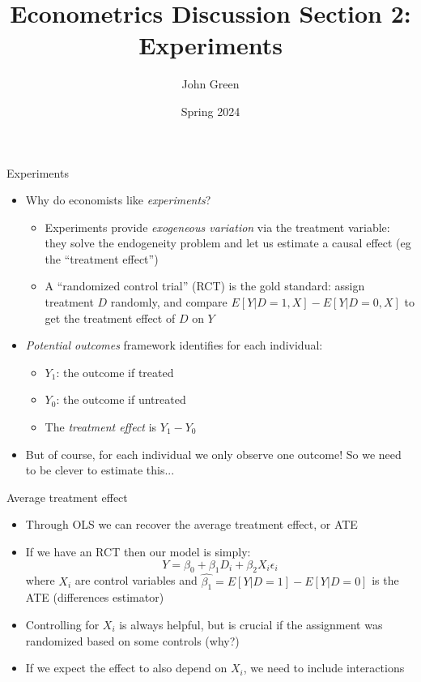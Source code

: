 \documentclass[aspectratio=169]{beamer}
\title{Econometrics Discussion Section 2: Experiments}
\author{John Green}
\date{Spring 2024}
\begin{document}
\begin{frame}
    \titlepage 
\end{frame}

\begin{frame}{Experiments}
    \begin{itemize}
        \item Why do economists like \textit{experiments}?
        \begin{itemize}
            \item Experiments provide \textit{exogeneous variation} via the treatment variable: they solve the endogeneity problem and let us estimate a causal effect (eg the ``treatment effect'')
            \item A ``randomized control trial'' (RCT) is the gold standard: assign treatment $D$ randomly, and compare $E[Y|D=1,X] - E[Y|D=0,X]$ to get the treatment effect of $D$ on $Y$
        \end{itemize}
        \item \textit{Potential outcomes} framework identifies for each individual:
        \begin{itemize}
            \item $Y_1$: the outcome if treated
            \item $Y_0$: the outcome if untreated
            \item The \textit{treatment effect} is $Y_1 - Y_0$
        \end{itemize}
        \item But of course, for each individual we only observe one outcome! So we need to be clever to estimate this...
    \end{itemize}
\end{frame}

\begin{frame}{Average treatment effect}
    \begin{itemize}
        \item Through OLS we can recover the average treatment effect, or ATE
        \item If we have an RCT then our model is simply:
        \begin{equation}
            Y = \beta_0 + \beta_1 D_i + \beta_2 X_i \epsilon_i
        \end{equation}
        where $X_i$ are control variables and $\hat{\beta_1} = E[Y|D=1] - E[Y|D=0]$ is the ATE (differences estimator)
        \item Controlling for $X_i$ is always helpful, but is crucial if the assignment was randomized based on some controls (why?)
        \item If we expect the effect to also depend on $X_i$, we need to include interactions
    \end{itemize}
\end{frame}
\end{document}
